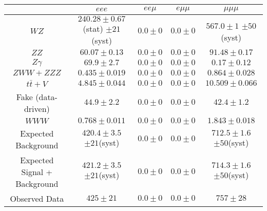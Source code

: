 \begin{tabular}{|c||c|c|c|c|}
\hline
 & $eee$ & $ee\mu$ & $e\mu\mu$ & $\mu\mu\mu$\\ 
\hline\hline
$WZ$ &  $240.28 \pm 0.67$(stat) $\pm 21$(syst) &  $0.0 \pm 0$ &  $0.0 \pm 0$ &  $567.0 \pm 1$ $\pm 50$(syst)\\ 
$ZZ$ &  $60.07 \pm 0.13$ &  $0.0 \pm 0$ &  $0.0 \pm 0$ &  $91.48 \pm 0.17$\\ 
$Z\gamma$ &  $69.9 \pm 2.7$ &  $0.0 \pm 0$ &  $0.0 \pm 0$ &  $0.17 \pm 0.12$\\ 
$ZWW+ZZZ$ &  $0.435 \pm 0.019$ &  $0.0 \pm 0$ &  $0.0 \pm 0$ &  $0.864 \pm 0.028$\\ 
$t\bar{t}+V$ &  $4.845 \pm 0.044$ &  $0.0 \pm 0$ &  $0.0 \pm 0$ &  $10.509 \pm 0.066$\\ 
Fake (data-driven) &  $44.9 \pm 2.2$ &  $0.0 \pm 0$ &  $0.0 \pm 0$ &  $42.4 \pm 1.2$\\ 
$WWW$ &  $0.768 \pm 0.011$ &  $0.0 \pm 0$ &  $0.0 \pm 0$ &  $1.843 \pm 0.018$\\ 
\hline
Expected Background &  $420.4 \pm 3.5$ $\pm 21$(syst)&  $0.0 \pm 0$ &  $0.0 \pm 0$ &  $712.5 \pm 1.6$ $\pm 50$(syst)\\ 
Expected Signal + Background &  $421.2 \pm 3.5$ $\pm 21$(syst)&  $0.0 \pm 0$ &  $0.0 \pm 0$ &  $714.3 \pm 1.6$ $\pm 50$(syst)\\ 
\hline
Observed Data &  $425 \pm 21$ &  $0.0 \pm 0$ &  $0.0 \pm 0$ &  $757 \pm 28$\\ 
\hline
\end{tabular}
